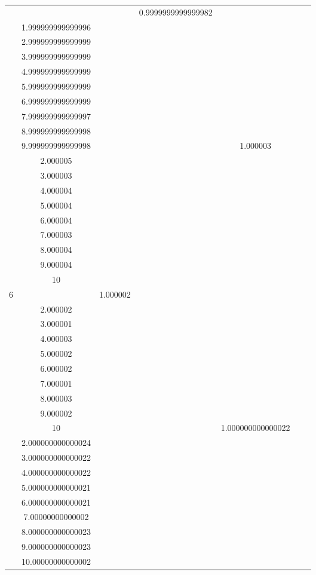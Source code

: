 \documentclass[oneside, final, 12pt]{extarticle}
\begin{document}
\begin{longtable}{|c|c|c|c|c|c|c|}
& ~ 
& \( \begin{aligned}
& 0.9999999999999982 \\ & 1.999999999999996 \\ & 2.999999999999999 \\ & 3.999999999999999 \\ & 4.999999999999999 \\ & 5.999999999999999 \\ & 6.999999999999999 \\ & 7.999999999999997 \\ & 8.999999999999998 \\ & 9.999999999999998 
\end{aligned} \)
& ~ 
& \( \begin{aligned}
& 1.000003 \\ & 2.000005 \\ & 3.000003 \\ & 4.000004 \\ & 5.000004 \\ & 6.000004 \\ & 7.000003 \\ & 8.000004 \\ & 9.000004 \\ & 10 
\end{aligned} \)
& ~ 
\\ \hline
\(6\) & \( \begin{aligned}
& 1.000002 \\ & 2.000002 \\ & 3.000001 \\ & 4.000003 \\ & 5.000002 \\ & 6.000002 \\ & 7.000001 \\ & 8.000003 \\ & 9.000002 \\ & 10 
\end{aligned} \)
& ~ 
& \( \begin{aligned}
& 1.000000000000022 \\ & 2.000000000000024 \\ & 3.000000000000022 \\ & 4.000000000000022 \\ & 5.000000000000021 \\ & 6.000000000000021 \\ & 7.00000000000002 \\ & 8.000000000000023 \\ & 9.000000000000023 \\ & 10.00000000000002 

\end{aligned}
\end{longtable}
\end{document}
